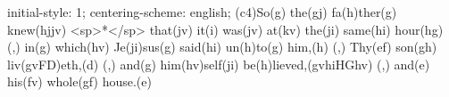 initial-style: 1;
centering-scheme: english;
(c4)So(g) the(gj) fa(h)ther(g) knew(hjjv) <sp>*</sp> that(jv) it(i) was(jv) at(kv) the(ji) same(hi) hour(hg) (,) in(g) which(hv) Je(ji)sus(g) said(hi) un(h)to(g) him,(h) (,) Thy(ef) son(gh) liv(gvFD)eth,(d) (,) and(g) him(hv)self(ji) be(h)lieved,(gvhiHGhv) (,) and(e) his(fv) whole(gf) house.(e)
